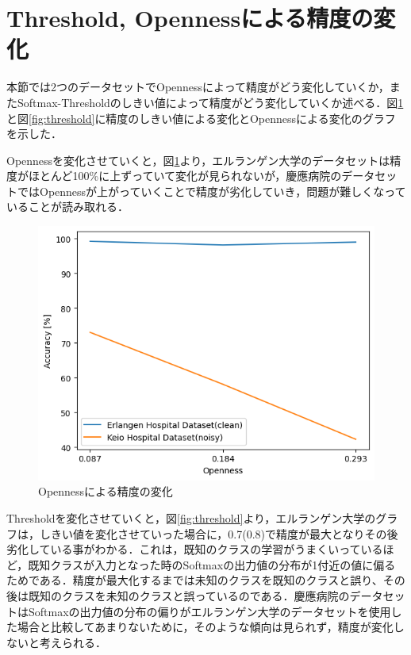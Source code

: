 \section{Threshold, Opennessによる精度の変化}
本節では2つのデータセットでOpennessによって精度がどう変化していくか，またSoftmax-Thresholdのしきい値によって精度がどう変化していくか述べる．図\ref{fig:openness}と図\ref{fig:threshold}に精度のしきい値による変化とOpennessによる変化のグラフを示した．

Opennessを変化させていくと，図\ref{fig:openness}より，エルランゲン大学のデータセットは精度がほとんど100\%に上ずっていて変化が見られないが，慶應病院のデータセットではOpennessが上がっていくことで精度が劣化していき，問題が難しくなっていることが読み取れる．

\begin{figure}[H]
  \begin{center}
  \includegraphics[width=0.8\linewidth]{./fig/openness_comparison.png}
  \end{center}
  \caption{Opennessによる精度の変化}
  \label{fig:openness}
  \end{figure}

Thresholdを変化させていくと，図\ref{fig:threshold}より，エルランゲン大学のグラフは，しきい値を変化させていった場合に，0.7(0.8)で精度が最大となりその後劣化している事がわかる．これは，既知のクラスの学習がうまくいっているほど，既知クラスが入力となった時のSoftmaxの出力値の分布が1付近の値に偏るためである．精度が最大化するまでは未知のクラスを既知のクラスと誤り、その後は既知のクラスを未知のクラスと誤っているのである．慶應病院のデータセットはSoftmaxの出力値の分布の偏りがエルランゲン大学のデータセットを使用した場合と比較してあまりないために，そのような傾向は見られず，精度が変化しないと考えられる．


